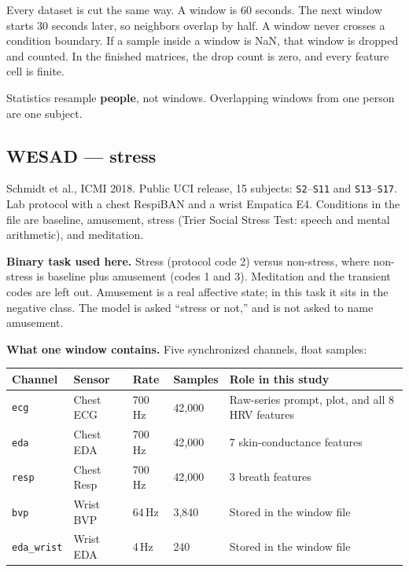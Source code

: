 \documentclass[11pt]{article}
\begin{document}
Every dataset is cut the same way. A window is 60 seconds. The next window starts 30 seconds later, so neighbors overlap by half. A window never crosses a condition boundary. If a sample inside a window is NaN, that window is dropped and counted. In the finished matrices, the drop count is zero, and every feature cell is finite.

Statistics resample \textbf{people}, not windows. Overlapping windows from one person are one subject.

\subsection{WESAD --- stress}

Schmidt et al., ICMI 2018. Public UCI release, 15 subjects: \texttt{S2}--\texttt{S11} and \texttt{S13}--\texttt{S17}. Lab protocol with a chest RespiBAN and a wrist Empatica E4. Conditions in the file are baseline, amusement, stress (Trier Social Stress Test: speech and mental arithmetic), and meditation.

\textbf{Binary task used here.} Stress (protocol code 2) versus non-stress, where non-stress is baseline plus amusement (codes 1 and 3). Meditation and the transient codes are left out. Amusement is a real affective state; in this task it sits in the negative class. The model is asked ``stress or not,'' and is not asked to name amusement.

\textbf{What one window contains.} Five synchronized channels, float samples:

\begin{center}
{\small
\begin{tabularx}{\textwidth}{@{}L{1.7cm}L{2.55cm}L{1.45cm}L{1.7cm}Y@{}}
\textbf{Channel} & \textbf{Sensor} & \textbf{Rate} & \textbf{Samples} & \textbf{Role in this study} \\
\midrule
\texttt{ecg} & Chest ECG & 700\,Hz & 42{,}000 & Raw-series prompt, plot, and all 8 HRV features \\
\texttt{eda} & Chest EDA & 700\,Hz & 42{,}000 & 7 skin-conductance features \\
\texttt{resp} & Chest Resp & 700\,Hz & 42{,}000 & 3 breath features \\
\texttt{bvp} & Wrist BVP & 64\,Hz & 3{,}840 & Stored in the window file \\
\texttt{eda\_wrist} & Wrist EDA & 4\,Hz & 240 & Stored in the window file \\
\bottomrule
\end{tabularx}
}
\end{center}
\end{document}
